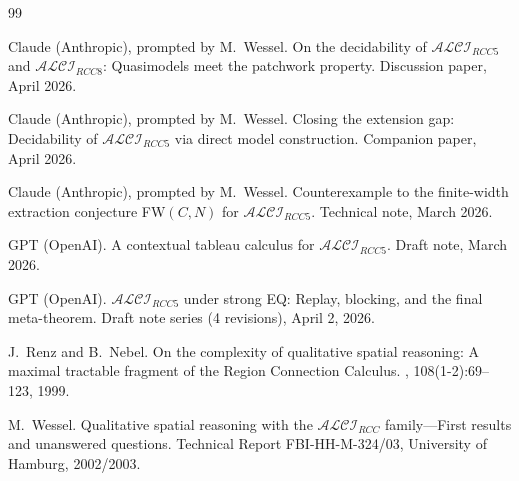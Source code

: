 \documentclass[a4paper,11pt]{article}
\theoremstyle{definition}
\begin{document}
\begin{thebibliography}{99}

Claude (Anthropic), prompted by M.~Wessel.
\newblock On the decidability of $\mathcal{ALCI}_{\mathit{RCC5}}$ and
  $\mathcal{ALCI}_{\mathit{RCC8}}$: Quasimodels meet the patchwork
  property.
\newblock Discussion paper, April 2026.

Claude (Anthropic), prompted by M.~Wessel.
\newblock Closing the extension gap: Decidability of
  $\mathcal{ALCI}_{\mathit{RCC5}}$ via direct model construction.
\newblock Companion paper, April 2026.

Claude (Anthropic), prompted by M.~Wessel.
\newblock Counterexample to the finite-width extraction conjecture
  FW$(C,N)$ for $\mathcal{ALCI}_{\mathit{RCC5}}$.
\newblock Technical note, March 2026.

GPT (OpenAI).
\newblock A contextual tableau calculus for
  $\mathcal{ALCI}_{\mathit{RCC5}}$.
\newblock Draft note, March 2026.

GPT (OpenAI).
\newblock $\mathcal{ALCI}_{\mathit{RCC5}}$ under strong EQ: Replay,
  blocking, and the final meta-theorem.
\newblock Draft note series (4 revisions), April 2, 2026.

J.~Renz and B.~Nebel.
\newblock On the complexity of qualitative spatial reasoning: A
  maximal tractable fragment of the {Region Connection Calculus}.
, 108(1-2):69--123, 1999.

M.~Wessel.
\newblock Qualitative spatial reasoning with the
  {$\mathcal{ALCI}_\mathit{RCC}$} family---{F}irst results and
  unanswered questions.
\newblock Technical Report FBI-HH-M-324/03, University of Hamburg,
  2002/2003.

\end{thebibliography}
\end{document}
